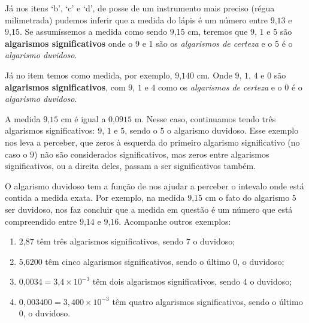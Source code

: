 Já nos itens ‘b’, ‘c’ e ‘d’, de posse de um instrumento mais preciso (régua milimetrada) pudemos inferir que a medida do lápis é um número entre $9\text{,}13$ e $9\text{,}15$.  Se assumíssemos a medida como sendo $9\text{,}15$ cm, teremos que $9$, $1$ e $5$ são \textbf{algarismos significativos} onde o $9$ e $1$ são os \emph{algarismos de certeza} e o $5$ é o \emph{algarismo duvidoso}.

Já no item  temos como medida, por exemplo, $9\text{,}140$ cm. Onde  $9$, $1$, $4$ e $0$ são \textbf{algarismos significativos}, com $9$,  $1$ e $4$ como os \emph{algarismos de certeza} e o $0$ é o \emph{algarismo duvidoso}.

A medida $9\text{,}15$ cm é igual a $0\text{,}0915$ m. Nesse caso, continuamos tendo três algarismos significativos: $9$,  $1$ e $5$, sendo o $5$ o algarismo duvidoso. Esse exemplo nos leva a perceber, que zeros à esquerda do primeiro algarismo significativo (no caso o $9$) não são considerados significativos, mas zeros entre algarismos significativos, ou a direita deles, passam a ser significativos também.

O algarismo duvidoso tem a função de nos ajudar a perceber o intevalo onde está contida a medida exata. Por exemplo, na medida $9\text{,}15$ cm o fato do algarismo $5$ ser duvidoso, nos faz concluir que a medida em questão é um número que está compreendido entre $9\text{,}14$ e $9\text{,}16$. Acompanhe outros exemplos:

\begin{example}{}

\begin{enumerate}
\item {} 
$2\text{,}87$ têm três algarismos significativos, sendo $7$ o duvidoso;

\item {} 
$5\text{,}6200$ têm cinco algarismos significativos, sendo o último $0$, o duvidoso;

\item {} 
$0\text{,}0034 = 3\text{,}4 \times 10^{-3}$ têm dois algarismos significativos, sendo $4$ o duvidoso;

\item {} 
$0,003400 = 3,400 \times 10^{-3}$ têm quatro algarismos significativos, sendo o último $0$, o duvidoso.

\end{enumerate}
\end{example}



